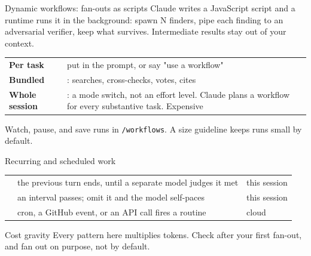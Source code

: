 \documentclass[aspectratio=169,11pt,t]{beamer}
\begin{document}
\begin{frame}{Dynamic workflows: fan-outs as scripts}
  \small
  Claude writes a JavaScript script and a runtime runs it in the background: spawn N finders, pipe each finding to an adversarial verifier, keep what survives. Intermediate results stay out of your context.\par\vspace{0.5em}
  \begin{tabularx}{\textwidth}{@{}L{2.6cm}Y@{}}
    \textbf{Per task} & put  in the prompt, or say "use a workflow"\\
    \textbf{Bundled} & : searches, cross-checks, votes, cites\\
    \textbf{Whole session} & : a mode switch, not an effort level. Claude plans a workflow for every substantive task. Expensive\\
  \end{tabularx}\par\vspace{0.4em}
  {\footnotesize\color{muted}Watch, pause, and save runs in \texttt{/workflows}. A size guideline keeps runs small by default.}
\end{frame}

\begin{frame}{Recurring and scheduled work}
  \small
  \begin{tabularx}{\textwidth}{@{}L{3.7cm}YL{2.3cm}@{}}
    \toprule
     &  & \\
    \midrule
     & the previous turn ends, until a separate model judges it met & this session\\
     & an interval passes; omit it and the model self-paces & this session\\
     & cron, a GitHub event, or an API call fires a routine & cloud\\
    \bottomrule
  \end{tabularx}\par\vspace{0.5em}
  \begin{callout}[warn]{Cost gravity}
    Every pattern here multiplies tokens. Check  after your first fan-out, and fan out on purpose, not by default.
  \end{callout}
\end{frame}
\end{document}
